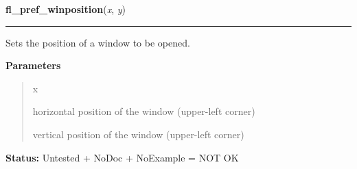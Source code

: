 \hspace{.8\funcindent}\begin{boxedminipage}{\funcwidth}

    \raggedright \textbf{fl\_pref\_winposition}(\textit{x}, \textit{y})

    \vspace{-1.5ex}

    \rule{\textwidth}{0.5\fboxrule}
\setlength{\parskip}{2ex}
    Sets the position of a window to be opened.

\setlength{\parskip}{1ex}
      \textbf{Parameters}
      \vspace{-1ex}

      \begin{quote}
        \begin{Ventry}{x}

          \item[x]

          horizontal position of the window (upper-left corner)

          \item[y]

          vertical position of the window (upper-left corner)

        \end{Ventry}

      \end{quote}

\textbf{Status:} Untested + NoDoc + NoExample = NOT OK



    \end{boxedminipage}

    \label{xformslib:library:fl_winminsize}

    \vspace{0.5ex}


